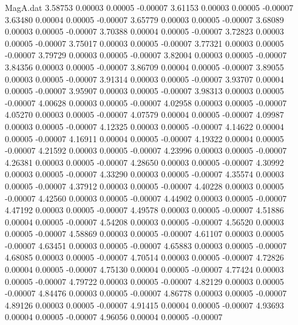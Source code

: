 \begin{filecontents}{MagA.dat}
   3.58753    0.00003    0.00005   -0.00007
   3.61153    0.00003    0.00005   -0.00007
   3.63480    0.00004    0.00005   -0.00007
   3.65779    0.00003    0.00005   -0.00007
   3.68089    0.00003    0.00005   -0.00007
   3.70388    0.00004    0.00005   -0.00007
   3.72823    0.00003    0.00005   -0.00007
   3.75017    0.00003    0.00005   -0.00007
   3.77321    0.00003    0.00005   -0.00007
   3.79729    0.00003    0.00005   -0.00007
   3.82004    0.00003    0.00005   -0.00007
   3.84356    0.00003    0.00005   -0.00007
   3.86709    0.00004    0.00005   -0.00007
   3.89055    0.00003    0.00005   -0.00007
   3.91314    0.00003    0.00005   -0.00007
   3.93707    0.00004    0.00005   -0.00007
   3.95907    0.00003    0.00005   -0.00007
   3.98313    0.00003    0.00005   -0.00007
   4.00628    0.00003    0.00005   -0.00007
   4.02958    0.00003    0.00005   -0.00007
   4.05270    0.00003    0.00005   -0.00007
   4.07579    0.00004    0.00005   -0.00007
   4.09987    0.00003    0.00005   -0.00007
   4.12325    0.00003    0.00005   -0.00007
   4.14622    0.00004    0.00005   -0.00007
   4.16911    0.00004    0.00005   -0.00007
   4.19322    0.00004    0.00005   -0.00007
   4.21592    0.00003    0.00005   -0.00007
   4.23996    0.00003    0.00005   -0.00007
   4.26381    0.00003    0.00005   -0.00007
   4.28650    0.00003    0.00005   -0.00007
   4.30992    0.00003    0.00005   -0.00007
   4.33290    0.00003    0.00005   -0.00007
   4.35574    0.00003    0.00005   -0.00007
   4.37912    0.00003    0.00005   -0.00007
   4.40228    0.00003    0.00005   -0.00007
   4.42560    0.00003    0.00005   -0.00007
   4.44902    0.00003    0.00005   -0.00007
   4.47192    0.00003    0.00005   -0.00007
   4.49578    0.00003    0.00005   -0.00007
   4.51886    0.00004    0.00005   -0.00007
   4.54208    0.00003    0.00005   -0.00007
   4.56520    0.00003    0.00005   -0.00007
   4.58869    0.00003    0.00005   -0.00007
   4.61107    0.00003    0.00005   -0.00007
   4.63451    0.00003    0.00005   -0.00007
   4.65883    0.00003    0.00005   -0.00007
   4.68085    0.00003    0.00005   -0.00007
   4.70514    0.00003    0.00005   -0.00007
   4.72826    0.00004    0.00005   -0.00007
   4.75130    0.00004    0.00005   -0.00007
   4.77424    0.00003    0.00005   -0.00007
   4.79722    0.00003    0.00005   -0.00007
   4.82129    0.00003    0.00005   -0.00007
   4.84476    0.00003    0.00005   -0.00007
   4.86778    0.00003    0.00005   -0.00007
   4.89126    0.00003    0.00005   -0.00007
   4.91415    0.00004    0.00005   -0.00007
   4.93693    0.00004    0.00005   -0.00007
   4.96056    0.00004    0.00005   -0.00007

\end{filecontents}
